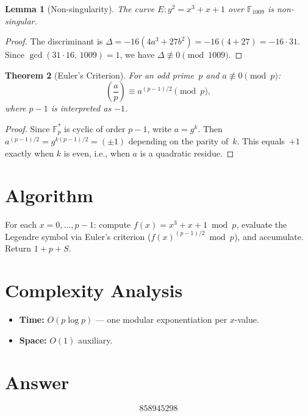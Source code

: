 \documentclass[11pt]{article}
\newtheorem{theorem}{Theorem}
\newtheorem{lemma}[theorem]{Lemma}
\theoremstyle{definition}
\begin{document}
\begin{lemma}[Non-singularity]
The curve $E: y^2 = x^3 + x + 1$ over $\mathbb{F}_{1009}$ is non-singular.
\end{lemma}

\begin{proof}
The discriminant is $\Delta = -16(4a^3 + 27b^2) = -16(4 + 27) = -16 \cdot 31$. Since $\gcd(31 \cdot 16,\, 1009) = 1$, we have $\Delta \not\equiv 0 \pmod{1009}$.
\end{proof}

\begin{theorem}[Euler's Criterion]
For an odd prime~$p$ and $a \not\equiv 0 \pmod{p}$:
\[
\left(\frac{a}{p}\right) \equiv a^{(p-1)/2} \pmod{p},
\]
where $p - 1$ is interpreted as $-1$.
\end{theorem}

\begin{proof}
Since $\mathbb{F}_p^*$ is cyclic of order $p-1$, write $a = g^k$. Then $a^{(p-1)/2} = g^{k(p-1)/2} = (\pm 1)$ depending on the parity of~$k$. This equals~$+1$ exactly when $k$ is even, i.e., when $a$ is a quadratic residue.
\end{proof}

\section{Algorithm}

For each $x = 0, \ldots, p-1$: compute $f(x) = x^3 + x + 1 \bmod p$, evaluate the Legendre symbol via Euler's criterion ($f(x)^{(p-1)/2} \bmod p$), and accumulate. Return $1 + p + S$.

\section{Complexity Analysis}

\begin{itemize}
    \item \textbf{Time:} $O(p \log p)$ --- one modular exponentiation per $x$-value.
    \item \textbf{Space:} $O(1)$ auxiliary.
\end{itemize}

\section{Answer}

\[
\boxed{858945298}
\]
\end{document}
